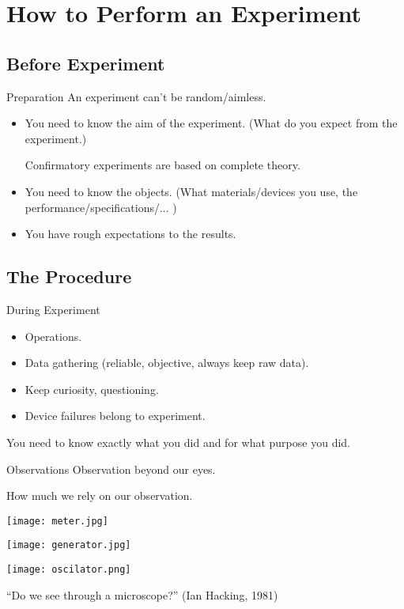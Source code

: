 \documentclass[14pt,t]{beamer}
\begin{document}
\section{How to Perform an Experiment}

\subsection{Before Experiment}
\begin{frame}{Preparation}
    An experiment can't be random/aimless.
\begin{itemize}
    \item You need to know the aim of the experiment.
        (What do you expect from the experiment.)

        Confirmatory experiments are based on complete theory.
    \item You need to know the objects.
        (What materials/devices you use, the performance/specifications/... )
    \item You have rough expectations to the results.
\end{itemize}

\end{frame}

\subsection{The Procedure}
\begin{frame}{During Experiment}
\begin{itemize}
    \item Operations.
    \item Data gathering (reliable, objective, always keep raw data).
    \item Keep curiosity, questioning.
    \item Device failures belong to experiment.
\end{itemize}
    You need to know exactly what you did and for what purpose you did.
\end{frame}

\begin{frame}{Observations}
Observation beyond our eyes.

How much we rely on our observation.
    \begin{center}
\begin{minipage}[c][4cm][c]{.4\textwidth}
    \texttt{[image: meter.jpg]}

    \texttt{[image: generator.jpg]}
\end{minipage}
\begin{minipage}[c][4cm][c]{.4\textwidth}
    \texttt{[image: oscilator.png]}
\end{minipage}
    \end{center}

``Do we see through a microscope?'' (Ian Hacking, 1981)
\end{frame}
\end{document}
